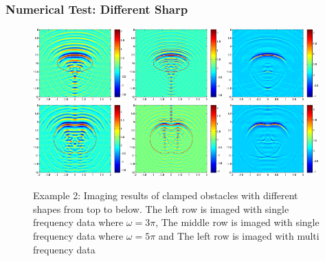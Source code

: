 \documentclass[utf-8,8pt]{beamer}
\newcommand{\om}{\omega}
\begin{document}
\begin{frame}
\frametitle{Numerical Test: Different Sharp}
\begin{figure}[h]
	\centering
	\includegraphics[width=0.32\textwidth]{./graphic/circle_3pi.eps}
	\includegraphics[width=0.32\textwidth]{./graphic/circle_5pi.eps}
	\includegraphics[width=0.32\textwidth]{./graphic/circle.eps}\\
	\includegraphics[width=0.32\textwidth]{./graphic/peanut_3pi.eps}
	\includegraphics[width=0.32\textwidth]{./graphic/peanut_5pi.eps}
	\includegraphics[width=0.32\textwidth]{./graphic/peanut.eps}
\caption{Example 2: Imaging results of clamped obstacles
		with different shapes from top to below. The left row is imaged with single frequency data where $\om=3\pi$, The middle row is imaged with single frequency data where $\om=5\pi$ and The left row is imaged with multi frequency data}
  \label{fig_wgout_ex2}
\end{figure}
\end{frame}
\end{document}
